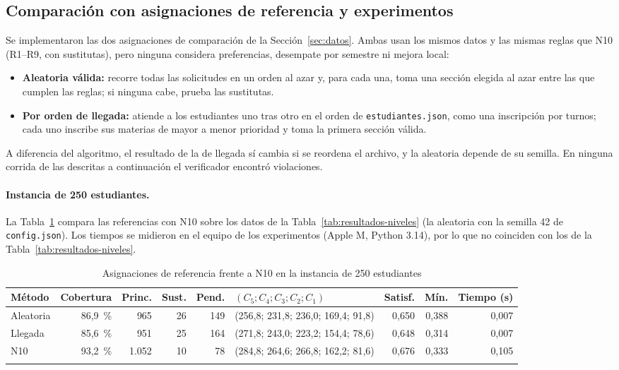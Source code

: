 \subsection{Comparación con asignaciones de referencia y experimentos}

Se implementaron las dos asignaciones de comparación de la Sección~\ref{sec:datos}. Ambas usan los mismos datos y las mismas reglas que N10 (R1--R9, con sustitutas), pero ninguna considera preferencias, desempate por semestre ni mejora local:
\begin{itemize}
\item \textbf{Aleatoria válida:} recorre todas las solicitudes en un orden al azar y, para cada una, toma una sección elegida al azar entre las que cumplen las reglas; si ninguna cabe, prueba las sustitutas.
\item \textbf{Por orden de llegada:} atiende a los estudiantes uno tras otro en el orden de \texttt{estudiantes.json}, como una inscripción por turnos; cada uno inscribe sus materias de mayor a menor prioridad y toma la primera sección válida.
\end{itemize}
A diferencia del algoritmo, el resultado de la de llegada sí cambia si se reordena el archivo, y la aleatoria depende de su semilla. En ninguna corrida de las descritas a continuación el verificador encontró violaciones.

\paragraph{Instancia de 250 estudiantes.} La Tabla~\ref{tab:referencias} compara las referencias con N10 sobre los datos de la Tabla~\ref{tab:resultados-niveles} (la aleatoria con la semilla 42 de \texttt{config.json}). Los tiempos se midieron en el equipo de los experimentos (Apple M, Python 3.14), por lo que no coinciden con los de la Tabla~\ref{tab:resultados-niveles}.

\begin{table}[htbp]
\caption{Asignaciones de referencia frente a N10 en la instancia de 250 estudiantes}\label{tab:referencias}
\footnotesize
\begin{tabular*}{\textwidth}{@{\extracolsep\fill}lrrrrlrrr@{}}
\toprule
Método & Cobertura & Princ. & Sust. & Pend. & $(C_5;C_4;C_3;C_2;C_1)$ & Satisf. & Mín. & Tiempo (s) \\
\midrule
Aleatoria & 86,9~\% & 965 & 26 & 149 & (256,8; 231,8; 236,0; 169,4; 91,8) & 0,650 & 0,388 & 0,007 \\
Llegada & 85,6~\% & 951 & 25 & 164 & (271,8; 243,0; 223,2; 154,4; 78,6) & 0,648 & 0,314 & 0,007 \\
N10 & 93,2~\% & 1.052 & 10 & 78 & (284,8; 264,6; 266,8; 162,2; 81,6) & 0,676 & 0,333 & 0,105 \\
\botrule
\end{tabular*}
\end{table}

